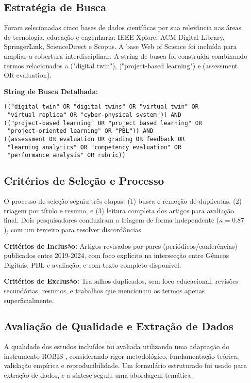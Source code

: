 \documentclass[english, spanish, brazilian]{RBIEarticle} %
\begin{document}
\subsection{Estratégia de Busca}

Foram selecionadas cinco bases de dados científicas por sua relevância nas áreas de tecnologia, educação e engenharia: IEEE Xplore, ACM Digital Library, SpringerLink, ScienceDirect e Scopus. A base Web of Science foi incluída para ampliar a cobertura interdisciplinar. A string de busca foi construída combinando termos relacionados a ("digital twin"), ("project-based learning") e (assessment OR evaluation).

\textbf{String de Busca Detalhada:}
\begin{verbatim}
(("digital twin" OR "digital twins" OR "virtual twin" OR
 "virtual replica" OR "cyber-physical system")) AND
(("project-based learning" OR "project based learning" OR
 "project-oriented learning" OR "PBL")) AND
((assessment OR evaluation OR grading OR feedback OR
 "learning analytics" OR "competency evaluation" OR
 "performance analysis" OR rubric))
\end{verbatim}

\subsection{Critérios de Seleção e Processo}

O processo de seleção seguiu três etapas: (1) busca e remoção de duplicatas, (2) triagem por título e resumo, e (3) leitura completa dos artigos para avaliação final. Dois pesquisadores conduziram a triagem de forma independente ($\kappa=0.87$), com um terceiro para resolver discordâncias.

\textbf{Critérios de Inclusão:} Artigos revisados por pares (periódicos/conferências) publicados entre 2019-2024, com foco explícito na intersecção entre Gêmeos Digitais, PBL e avaliação, e com texto completo disponível.

\textbf{Critérios de Exclusão:} Trabalhos duplicados, sem foco educacional, revisões secundárias, resumos, e trabalhos que mencionam os termos apenas superficialmente.

\subsection{Avaliação de Qualidade e Extração de Dados}

A qualidade dos estudos incluídos foi avaliada utilizando uma adaptação do instrumento ROBIS \parencite{Whiting2016}, considerando rigor metodológico, fundamentação teórica, validação empírica e reproducibilidade. Um formulário estruturado foi usado para extração de dados, e a síntese seguiu uma abordagem temática \parencite{Braun2006}.
\end{document}
